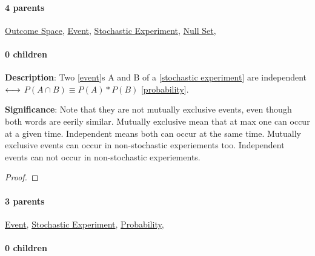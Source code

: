 \documentclass[../main.tex]{subfiles}
\begin{document}
\paragraph{4 parents} \hyperref[statement:Outcome Space]{Outcome Space}, \hyperref[statement:Event]{Event}, \hyperref[statement:Stochastic Experiment]{Stochastic Experiment}, \hyperref[statement:Null Set]{Null Set}, 
\paragraph{0 children} 



\begin{statement}
\label{statement:Independent Events}\hspace*{0pt}\par
\end{statement}
\textbf{Description}:
Two [\hyperref[statement:Event]{event}]s A and B of a [\hyperref[statement:Stochastic Experiment]{stochastic experiment}] are independent $ \longleftrightarrow $ $ P(A \cap B) \equiv P(A) * P(B) $ [\hyperref[statement:Probability]{probability}].
\par
{\color{magenta} \textbf{Significance}:
Note that they are not mutually exclusive events, even though both words are eerily similar.
Mutually exclusive mean that at max one can occur at a given time.
Independent means both can occur at the same time.
Mutually exclusive events can occur in non-stochastic experiements too.
Independent events can not occur in non-stochastic experiements.
\par}
\begin{proof}
\proofbydefinition
\end{proof}\par
\paragraph{3 parents} \hyperref[statement:Event]{Event}, \hyperref[statement:Stochastic Experiment]{Stochastic Experiment}, \hyperref[statement:Probability]{Probability}, 
\paragraph{0 children} 
\end{document}
